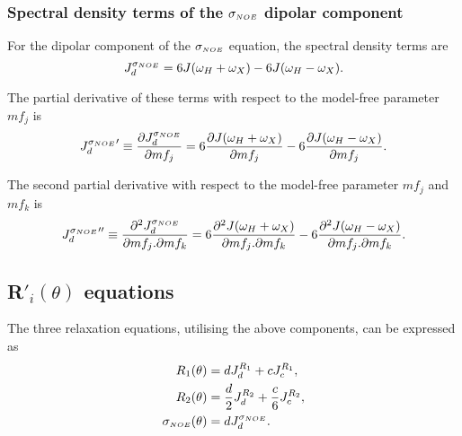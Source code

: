 \subsubsection{Spectral density terms of the $\sigma_{\scriptscriptstyle NOE}$ dipolar component}

For the dipolar component of the $\sigma_{\scriptscriptstyle NOE}$ equation, the spectral density terms are
\begin{equation}
    J_d^{\sigma_{\scriptscriptstyle NOE}} = 6J(\omega_H + \omega_X) - 6J(\omega_H - \omega_X).  \label{eq: J terms: JsigmaNOEd}
\end{equation}

\noindent The partial derivative of these terms with respect to the model-free parameter $mf_j$ is
\begin{equation}
    {J_d^{\sigma_{\scriptscriptstyle NOE}}}' \equiv \frac{\partial J_d^{\sigma_{\scriptscriptstyle NOE}}}{\partial mf_j}
        = 6 \frac{\partial J(\omega_H + \omega_X)}{\partial mf_j}
        - 6 \frac{\partial J(\omega_H - \omega_X)}{\partial mf_j}.  \label{eq: J terms: JsigmaNOEd'}
\end{equation}

\noindent The second partial derivative with respect to the model-free parameter $mf_j$ and $mf_k$ is
\begin{equation}
    {J_d^{\sigma_{\scriptscriptstyle NOE}}}'' \equiv \frac{\partial^2 J_d^{\sigma_{\scriptscriptstyle NOE}}}{\partial mf_j . \partial mf_k}
        = 6 \frac{\partial^2 J(\omega_H + \omega_X)}{\partial mf_j . \partial mf_k}
        - 6 \frac{\partial^2 J(\omega_H - \omega_X)}{\partial mf_j . \partial mf_k}.  \label{eq: J terms: JsigmaNOEd"}
\end{equation}




\subsection{R$'_i(\theta)$ equations}

The three relaxation equations, utilising the above components, can be expressed as
\begin{align}
    R_1(\theta) & = d J_d^{R_1} + c J_c^{R_1},                          \label{eq: Ri': R1} \\
    R_2(\theta) & = \frac{d}{2} J_d^{R_2} + \frac{c}{6} J_c^{R_2},      \label{eq: Ri': R2} \\
    \sigma_{\scriptscriptstyle NOE}(\theta) & = d J_d^{\sigma_{\scriptscriptstyle NOE}}.                            \label{eq: Ri': sigmaNOE}
\end{align}



